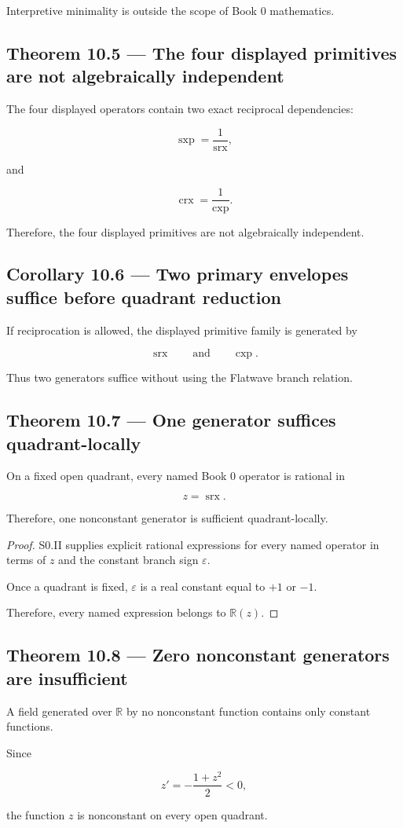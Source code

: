 \documentclass[11pt,oneside,openany]{book}
\newcommand{\PCsubsection}[1]{%
  \subsection*{#1}%
}
\begin{document}
Interpretive minimality is outside the scope of Book 0 mathematics.

\PCsubsection{Theorem 10.5 --- The four displayed primitives are not algebraically independent}

The four displayed operators contain two exact reciprocal dependencies:

\[
\operatorname{sxp} = \frac1{\operatorname{srx}},
\]

and

\[
\operatorname{crx} = \frac1{\operatorname{cxp}}.
\]

Therefore, the four displayed primitives are not algebraically independent.

\PCsubsection{Corollary 10.6 --- Two primary envelopes suffice before quadrant reduction}

If reciprocation is allowed, the displayed primitive family is generated by

\[
\operatorname{srx} \qquad\text{and}\qquad \operatorname{cxp}.
\]

Thus two generators suffice without using the Flatwave branch relation.

\PCsubsection{Theorem 10.7 --- One generator suffices quadrant-locally}

On a fixed open quadrant, every named Book 0 operator is rational in

\[
z=\operatorname{srx}.
\]

Therefore, one nonconstant generator is sufficient quadrant-locally.

\begin{proof}
S0.II supplies explicit rational expressions for every named operator in terms of \(z\) and the constant branch sign \(\varepsilon\).

Once a quadrant is fixed, \(\varepsilon\) is a real constant equal to \(+1\) or \(-1\).

Therefore, every named expression belongs to \(\mathbb R(z)\).

\end{proof}

\PCsubsection{Theorem 10.8 --- Zero nonconstant generators are insufficient}

A field generated over \(\mathbb R\) by no nonconstant function contains only constant functions.

Since

\[
z'=-\frac{1+z^2}{2}<0,
\]

the function \(z\) is nonconstant on every open quadrant.
\end{document}
